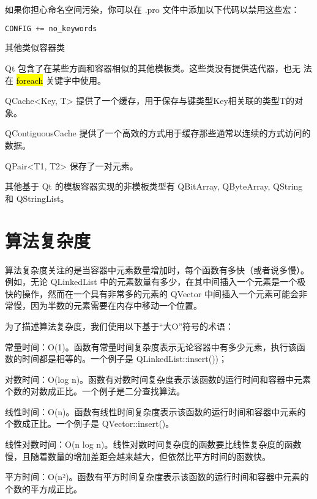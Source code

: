 如果你担心命名空间污染，你可以在 .pro 文件中添加以下代码以禁用这些宏：

\begin{lstlisting}[language=C++]
CONFIG += no_keywords
\end{lstlisting}

\splitLine

其他类似容器类

Qt 包含了在某些方面和容器相似的其他模板类。这些类没有提供迭代器，也无
法在 \hl{foreach} 关键字中使用。

\begin{compactitem}
\item QCache<Key, T> 提供了一个缓存，用于保存与键类型Key相关联的类型T的对象。
\item QContiguousCache 提供了一个高效的方式用于缓存那些通常以连续的方式访问的数据。
\item QPair<T1, T2> 保存了一对元素。
\end{compactitem}

其他基于 Qt 的模板容器实现的非模板类型有 QBitArray, QByteArray, QString 和 QStringList。

\splitLine

\section{算法复杂度}

算法复杂度关注的是当容器中元素数量增加时，每个函数有多快（或者说多慢）。例如，无论 QLinkedList 中的元素数量有多少，在其中间插入一个元素是一个极快的操作，然而在一个具有非常多的元素的 QVector 中间插入一个元素可能会非常慢，因为半数的元素需要在内存中移动一个位置。

为了描述算法复杂度，我们使用以下基于“大O”符号的术语：

\begin{compactitem}
\item 常量时间：O(1)。函数有常量时间复杂度表示无论容器中有多少元素，执行该函数的时间都是相等的。一个例子是 QLinkedList::insert())；
\item 对数时间：O(log n)。函数有对数时间复杂度表示该函数的运行时间和容器中元素个数的对数成正比。一个例子是二分查找算法。
\item 线性时间：O(n)。函数有线性时间复杂度表示该函数的运行时间和容器中元素的个数成正比。一个例子是 QVector::insert()。
\item 线性对数时间：O(n log n)。线性对数时间复杂度的函数要比线性复杂度的函数慢，且随着数量的增加差距会越来越大，但依然比平方时间的函数快。
\item 平方时间：O(n²)。函数有平方时间复杂度表示该函数的运行时间和容器中元素的个数的平方成正比。
\end{compactitem}

